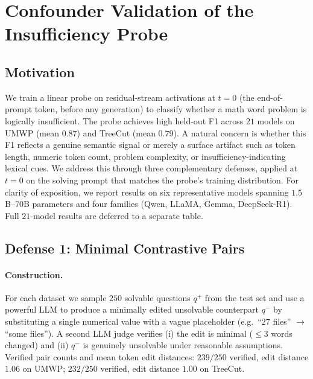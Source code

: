 %

\section{Confounder Validation of the Insufficiency Probe}
\label{sec:confounder}

\subsection{Motivation}

We train a linear probe on residual-stream activations at $t{=}0$
(the end-of-prompt token, before any generation) to classify whether a
math word problem is logically insufficient. The probe achieves high
held-out F1 across $21$ models on UMWP (mean $0.87$) and TreeCut (mean
$0.79$). A natural concern is whether this F1 reflects a genuine
semantic signal or merely a surface artifact such as token length,
numeric token count, problem complexity, or insufficiency-indicating
lexical cues. We address this through three complementary defenses,
applied at $t{=}0$ on the solving prompt that matches the probe's
training distribution. For clarity of exposition, we report results on
six representative models spanning $1.5$B--$70$B parameters and four
families (Qwen, LLaMA, Gemma, DeepSeek-R1). Full $21$-model results are
deferred to a separate table.

\subsection{Defense 1: Minimal Contrastive Pairs}
\label{sec:d1}

\paragraph{Construction.}
For each dataset we sample $250$ solvable questions $q^+$ from the test
set and use a powerful LLM to produce a minimally edited unsolvable
counterpart $q^-$ by substituting a single numerical value with a vague
placeholder (e.g.\ ``$27$ files'' $\to$ ``some files''). A second LLM
judge verifies (i) the edit is minimal ($\le 3$ words changed) and
(ii) $q^-$ is genuinely unsolvable under reasonable assumptions.
Verified pair counts and mean token edit distances:
$239/250$ verified, edit distance $1.06$ on UMWP;
$232/250$ verified, edit distance $1.00$ on TreeCut.


